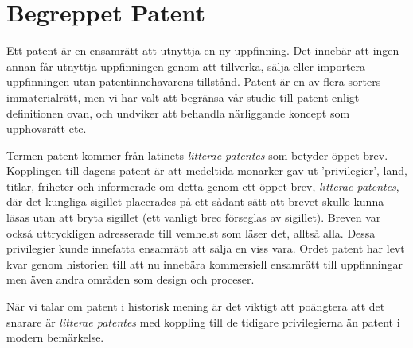 \section{Begreppet Patent}

Ett patent är en ensamrätt att utnyttja en ny uppfinning. Det innebär att ingen
annan får utnyttja uppfinningen genom att tillverka, sälja eller importera 
uppfinningen utan patentinnehavarens tillstånd. Patent är en av flera sorters
immaterialrätt, men vi har valt att begränsa vår studie till patent enligt
definitionen ovan, och undviker att behandla närliggande koncept som upphovsrätt
etc.


Termen patent kommer från latinets \emph{litterae patentes} som
betyder öppet brev. Kopplingen till dagens patent är att medeltida monarker gav
ut 'privilegier', land, titlar, friheter och informerade om detta genom ett
öppet brev, \emph{litterae patentes}, där det kungliga sigillet placerades på
ett sådant sätt att brevet skulle kunna läsas utan att bryta sigillet\cite{blackstone} (ett vanligt brec förseglas av sigillet). Breven var också uttryckligen adresserade till 
vemhelst som läser det, alltså alla. Dessa privilegier kunde innefatta ensamrätt
att sälja en viss vara. Ordet patent har levt kvar genom historien till 
att nu innebära kommersiell ensamrätt till uppfinningar men även andra områden som design och proceser. 

När vi talar om patent i historisk mening är det viktigt att poängtera att det 
snarare är \emph{litterae patentes} med koppling till de tidigare 
privilegierna än patent i modern bemärkelse. 
